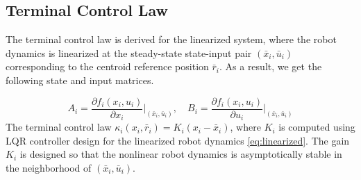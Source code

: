\subsection{Terminal Control Law}
The terminal control law is derived for the linearized system, where the robot dynamics is linearized at the steady-state state-input pair $(\bar{x}_i, \bar{u}_i)$ corresponding to the centroid reference position $\bar{r}_i$. As a result, we get the following state and input matrices.

\begin{equation}
\label{eq:linearized}
    A_{i} = \frac{\partial f_i(x_{i}, u_{i})}{\partial x_i}\bigg|_{(\bar{x}_i, \bar{u}_i)}, \quad B_{i} = \frac{\partial f_i(x_i, u_i)}{\partial u_i}\bigg|_{(\bar{x}_i, \bar{u}_i)}
\end{equation}
The terminal control law $\kappa_i(x_i, \bar{r}_i) = K_i(x_i - \bar{x}_i)$, where $K_i$ is computed using LQR controller design for the linearized robot dynamics \eqref{eq:linearized}. The gain $K_i$ is designed so that the nonlinear robot dynamics is asymptotically stable in the neighborhood of $(\bar{x}_i, \bar{u}_i)$.

